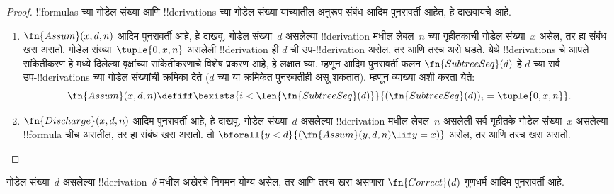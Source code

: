 \documentclass[../../../include/open-logic-section]{subfiles}
\begin{document}
\begin{proof}
  !!{formula}s च्या गोडेल संख्या आणि !!{derivation}s च्या गोडेल
  संख्या यांच्यातील अनुरूप संबंध आदिम पुनरावर्ती आहेत, हे दाखवायचे आहे.
  \begin{enumerate}
  \item $\fn{Assum}(x, d, n)$ आदिम पुनरावर्ती आहे, हे दाखवू.
    गोडेल संख्या~$d$ असलेल्या !!{derivation} मधील लेबल~$n$ च्या
    गृहीतकाची गोडेल संख्या~$x$ असेल, तर हा संबंध खरा असतो.
    गोडेल संख्या~$\tuple{0, x, n}$ असलेली !!{derivation} ही
    $d$ ची उप-!!{derivation} असेल, तर आणि तरच असे घडते. येथे
    !!{derivation}s चे आपले सांकेतीकरण हे
     मध्ये दिलेल्या वृक्षांच्या
    सांकेतीकरणाचे विशेष प्रकरण आहे, हे लक्षात घ्या. म्हणून आदिम
    पुनरावर्ती फलन $\fn{SubtreeSeq}(d)$ हे $d$ च्या सर्व
    उप-!!{derivation}s च्या गोडेल संख्यांची क्रमिका देते
    ($d$ च्या या क्रमिकेत पुनरुक्तीही असू शकतात). म्हणून व्याख्या अशी करता येते:
    \[
    \fn{Assum}(x, d, n) \defiff \bexists{i<\len{\fn{SubtreeSeq}(d)}}{(\fn{SubtreeSeq}(d))_i =
      \tuple{0, x, n}}.
    \]
  \item $\fn{Discharge}(x, d, n)$ आदिम पुनरावर्ती आहे, हे दाखवू.
    गोडेल संख्या~$d$ असलेल्या !!{derivation} मधील लेबल~$n$
    असलेली सर्व गृहीतके गोडेल संख्या~$x$ असलेल्या !!{formula}
    चीच असतील, तर हा संबंध खरा असतो. तो
    $\bforall{y<d}{(\fn{Assum}(y, d, n) \lif y
      = x)}$ असेल, तर आणि तरच खरा असतो.
  \end{enumerate}
\end{proof}

\begin{prop}
  गोडेल संख्या~$d$ असलेल्या !!{derivation}~$\delta$ मधील अखेरचे
  निगमन योग्य असेल, तर आणि तरच खरा असणारा $\fn{Correct}(d)$ गुणधर्म
  आदिम पुनरावर्ती आहे.
\end{prop}
\end{document}
